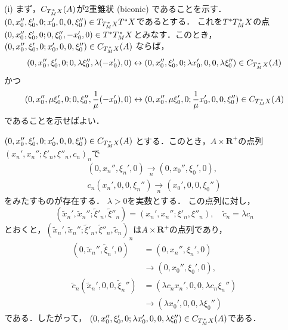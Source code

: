 \documentclass[leqno, 10pt, a4paper, dvipdfmx]{jsarticle}
\makeatletter
\theoremstyle{definition}
\newcommand{\rr}{\mathbf{R}}
\renewenvironment{proof}[1][\proofname]{\par
  \pushQED{\qed}%
  \normalfont \topsep6\p@\@plus6\p@\relax
  \trivlist
  \item[\hskip\labelsep
         \bfseries
    {#1}]\ignorespaces
}{%
  \popQED\endtrivlist\@endpefalse
}
\renewcommand{\proofname}{証明.}
\numberwithin{equation}{section}
\newcommand{\rrp}{\rr^{+}} %
\theoremstyle{mystyle}
\newcommand{\cotb}[1][]{T^{\ast}{#1}}
\newcommand{\conm}[2][]{T_{#1}^{\hspace{0.7pt}\ast}{#2}}
\newcommand{\norb}[2][]{T_{#1}{#2}}
\newcommand{\wncone}[1][]{C_{#1}} %
\makeatother
\begin{document}
\begin{proof}
    (i) 
    まず，\(\wncone[{\conm[M]{X}}](A)\)が2重錐状 (biconic) であることを示す．
    \(
        (0,x_0'',\xi_0',0;x_0',0,0,\xi_0'')
        \in \norb[{\conm[M]{X}}]{\cotb[X]}
    \)であるとする．
    これを\(\cotb[{\conm[M]{X}}]\)の点
    \(
        (0,x_0'',\xi_0',0;0,\xi_0'',-x_0',0)
        \in \cotb[{\conm[M]{X}}]
    \)とみなす．このとき，
    \((0,x_0'',\xi_0',0;x_0',0,0,\xi_0'')\in\wncone[{\conm[M]{X}}](A)\)
    ならば，
    \[
        (0,x_0'',\xi_0',0;0,\lambda\xi_0'',\lambda(-x_0'),0)
        \leftrightarrow
        (0,x_0'',\xi_0',0;\lambda x_0',0,0,\lambda\xi_0'')
        \in\wncone[{\conm[M]{X}}](A)
    \]かつ
    \[
        (0,x_0'',\mu\xi_0',0;0,\xi_0'',\frac{1}{\mu}(-x_0'),0)
        \leftrightarrow
        (0,x_0'',\mu\xi_0',0;\frac{1}{\mu}x_0',0,0,\xi_0'')
        \in\wncone[{\conm[M]{X}}](A)
    \]であることを示せばよい．

    \((0,x_0'',\xi_0',0;x_0',0,0,\xi_0'')\in\wncone[{\conm[M]{X}}](A)\)
    とする．このとき，\(A\times\rrp\)の点列\(
        \left(
            x_n',x_n'';\xi'_n,\xi''_n,
            c_n
        \right)_n
    \)で\begin{align*}
        (0,x_n'',\xi_n',0)
        \underset{n}{\to} (0,x_0'',\xi_0',0),\\
        c_n(x_n',0,0,\xi_n'')
        \underset{n}{\to} (x_0',0,0,\xi_0'')
    \end{align*}
    をみたすものが存在する．
    \(\lambda>0\)を実数とする．
    この点列に対し，\[
        \left(\tilde{x}_n',\tilde{x}_n'';\tilde{\xi}'_n,\tilde{\xi}''_n\right)
        =
        \left(x_n',x_n'';\xi'_n,\xi''_n\right),
        \quad
        \tilde{c}_n=\lambda c_n
    \]
    とおくと，\(\left(
        \tilde{x}_n',\tilde{x}_n'';\tilde{\xi}'_n,\tilde{\xi}''_n,
        \tilde{c}_n
    \right)_n\)は\(A\times \rrp\)の点列であり，
    \begin{align*}
        (0,\tilde{x}_n'',\tilde{\xi}_n',0)
        &=(0,x_n'',\xi_n',0)\\
        &\to(0,x_0'',\xi_0',0),\\
        \tilde{c}_n(\tilde{x}_n',0,0,\tilde{\xi}_n'')
        &=(\lambda c_n x_n',0,0,\lambda c_n \xi_n'')\\
        &\to(\lambda x_0',0,0,\lambda\xi_0'')
    \end{align*}
    である．したがって，
    \(
        (0,x_0'',\xi_0',0;\lambda x_0',0,0,\lambda\xi_0'')
        \in\wncone[{\conm[M]{X}}](A)
    \)である．


\end{proof}
\end{document}
